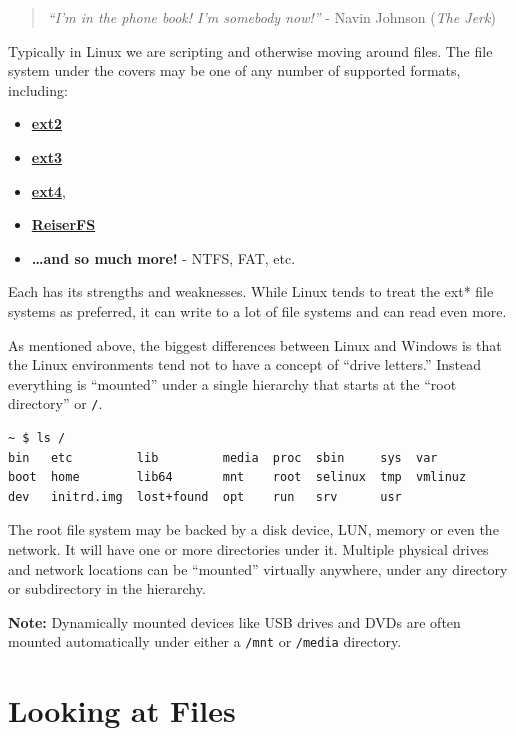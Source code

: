 \documentclass[10pt,]{book}
\numberwithin{figure}{chapter}
\begin{document}
\begin{quote}
\emph{``I'm in the phone book! I'm somebody now!''} - Navin Johnson
(\emph{The Jerk})
\end{quote}

Typically in Linux we are scripting and otherwise moving around files.
The file system under the covers may be one of any number of supported
formats, including:

\begin{itemize}
\item
  \href{https://en.wikipedia.org/wiki/Ext2}{\textbf{ext2}}
\item
  \href{https://en.wikipedia.org/wiki/Ext3}{\textbf{ext3}}
\item
  \href{https://en.wikipedia.org/wiki/Ext4}{\textbf{ext4}},
\item
  \href{https://en.wikipedia.org/wiki/ReiserFS}{\textbf{ReiserFS}}
\item
  \textbf{\ldots{}and so much more!} - NTFS, FAT, etc.
\end{itemize}

Each has its strengths and weaknesses. While Linux tends to treat the
ext* file systems as preferred, it can write to a lot of file systems
and can read even more.

As mentioned above, the biggest differences between Linux and Windows is
that the Linux environments tend not to have a concept of ``drive
letters.'' Instead everything is ``mounted'' under a single hierarchy
that starts at the ``root directory'' or \texttt{/}.

\begin{verbatim}
~ $ ls /
bin   etc         lib         media  proc  sbin     sys  var
boot  home        lib64       mnt    root  selinux  tmp  vmlinuz
dev   initrd.img  lost+found  opt    run   srv      usr
\end{verbatim}

The root file system may be backed by a disk device, LUN, memory or even
the network. It will have one or more directories under it. Multiple
physical drives and network locations can be ``mounted'' virtually
anywhere, under any directory or subdirectory in the hierarchy.

\textbf{Note:} Dynamically mounted devices like USB drives and DVDs are
often mounted automatically under either a \texttt{/mnt} or
\texttt{/media} directory.

\section{Looking at Files}\label{looking-at-files}
\end{document}
